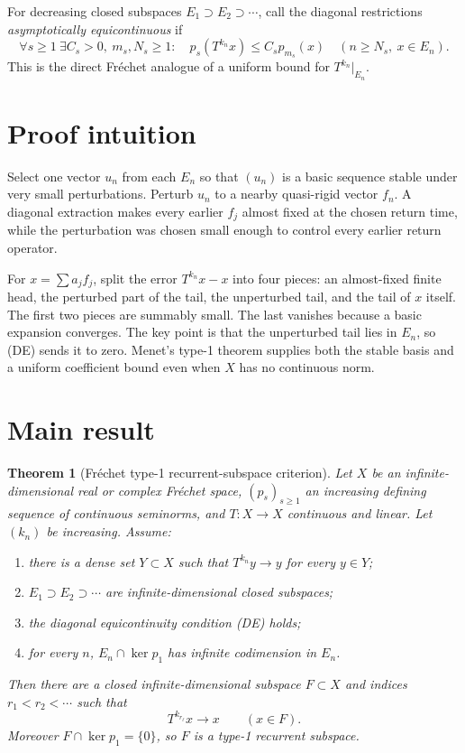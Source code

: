 \documentclass[10pt]{article}
\newtheorem{theorem}{Theorem}
\begin{document}
For decreasing closed subspaces $E_1\supset E_2\supset\cdots$, call the diagonal restrictions \emph{asymptotically equicontinuous} if
\begin{equation*}
\forall s\geq1\ \exists C_s>0,\ m_s,N_s\geq1:\quad
p_s(T^{k_n}x)\leq C_s p_{m_s}(x)
\quad(n\geq N_s,\ x\in E_n).
\tag{DE}
\end{equation*}
This is the direct Fr\'echet analogue of a uniform bound for $T^{k_n}|_{E_n}$.

\section*{Proof intuition}

Select one vector $u_n$ from each $E_n$ so that $(u_n)$ is a basic sequence stable under very small perturbations.  Perturb $u_n$ to a nearby quasi-rigid vector $f_n$.  A diagonal extraction makes every earlier $f_j$ almost fixed at the chosen return time, while the perturbation was chosen small enough to control every earlier return operator.

For $x=\sum a_jf_j$, split the error $T^{k_n}x-x$ into four pieces: an almost-fixed finite head, the perturbed part of the tail, the unperturbed tail, and the tail of $x$ itself.  The first two pieces are summably small.  The last vanishes because a basic expansion converges.  The key point is that the unperturbed tail lies in $E_n$, so (DE) sends it to zero.  Menet's type-1 theorem supplies both the stable basis and a uniform coefficient bound even when $X$ has no continuous norm.

\section*{Main result}

\begin{theorem}[Fr\'echet type-1 recurrent-subspace criterion]
Let $X$ be an infinite-dimensional real or complex Fr\'echet space, $(p_s)_{s\geq1}$ an increasing defining sequence of continuous seminorms, and $T\colon X\to X$ continuous and linear.  Let $(k_n)$ be increasing.  Assume:
\begin{enumerate}[label=\textup{(\roman*)},leftmargin=2.4em]
\item there is a dense set $Y\subset X$ such that $T^{k_n}y\to y$ for every $y\in Y$;
\item $E_1\supset E_2\supset\cdots$ are infinite-dimensional closed subspaces;
\item the diagonal equicontinuity condition \textup{(DE)} holds;
\item for every $n$, $E_n\cap\ker p_1$ has infinite codimension in $E_n$.
\end{enumerate}
Then there are a closed infinite-dimensional subspace $F\subset X$ and indices
$r_1<r_2<\cdots$ such that
\[
T^{k_{r_\ell}}x\longrightarrow x\qquad(x\in F).
\]
Moreover $F\cap\ker p_1=\{0\}$, so $F$ is a type-1 recurrent subspace.
\end{theorem}
\end{document}

